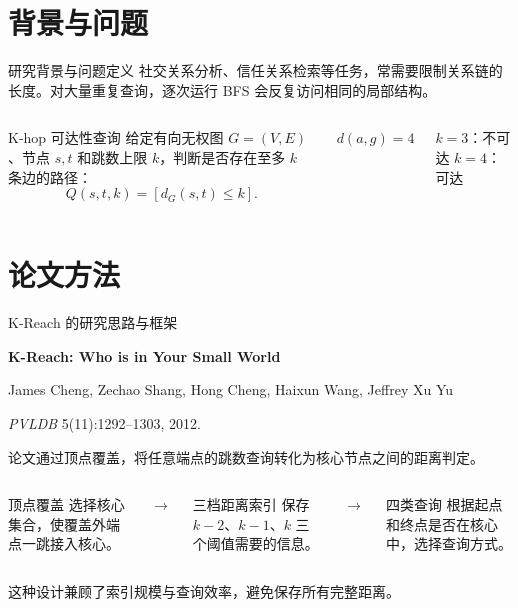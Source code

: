 \section{背景与问题}
\begin{frame}{研究背景与问题定义}
社交关系分析、信任关系检索等任务，常需要限制关系链的长度。对大量重复查询，逐次运行 BFS 会反复访问相同的局部结构。
\par\vspace{2mm}
\begin{columns}[c,onlytextwidth]
\begin{block}{K-hop 可达性查询}
给定有向无权图 $G=(V,E)$、节点 $s,t$ 和跳数上限 $k$，判断是否存在至多 $k$ 条边的路径：
\[
Q(s,t,k)=[d_G(s,t)\le k].
\]
\end{block}
\centering
{}\par\vspace{2mm}
$d(a,g)=4$\par
$k=3$：不可达 \qquad $k=4$：可达
\end{columns}
\end{frame}

\section{论文方法}
\begin{frame}{K-Reach 的研究思路与框架}
\noindent
{\fontsize{10.5}{13}\selectfont
\textbf{K-Reach: Who is in Your Small World}\par
James Cheng, Zechao Shang, Hong Cheng, Haixun Wang, Jeffrey Xu Yu\par
\emph{PVLDB} 5(11):1292–1303, 2012.}\par\vspace{3mm}
论文通过顶点覆盖，将任意端点的跳数查询转化为核心节点之间的距离判定。
\par\vspace{2mm}
\begin{columns}[c,onlytextwidth]
\begin{block}{顶点覆盖}
选择核心集合，使覆盖外端点一跳接入核心。
\end{block}
\centering$\rightarrow$
\begin{block}{三档距离索引}
保存 $k-2$、$k-1$、$k$ 三个阈值需要的信息。
\end{block}
\centering$\rightarrow$
\begin{block}{四类查询}
根据起点和终点是否在核心中，选择查询方式。
\end{block}
\end{columns}
\par\vspace{2mm}
这种设计兼顾了索引规模与查询效率，避免保存所有完整距离。
\end{frame}

